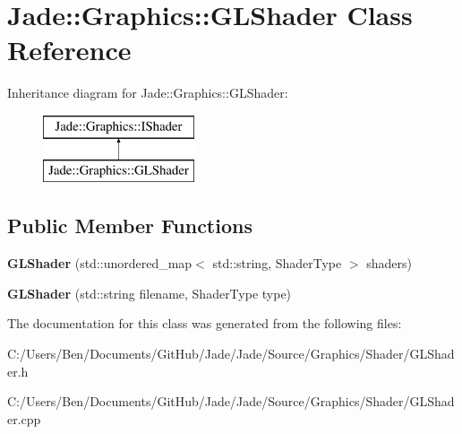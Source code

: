 \hypertarget{class_jade_1_1_graphics_1_1_g_l_shader}{}\section{Jade\+:\+:Graphics\+:\+:G\+L\+Shader Class Reference}
\label{class_jade_1_1_graphics_1_1_g_l_shader}
Inheritance diagram for Jade\+:\+:Graphics\+:\+:G\+L\+Shader\+:\begin{figure}[H]
\begin{center}
\leavevmode
\includegraphics[height=2.000000cm]{class_jade_1_1_graphics_1_1_g_l_shader}
\end{center}
\end{figure}
\subsection*{Public Member Functions}
\begin{DoxyCompactItemize}
\item 
\hypertarget{class_jade_1_1_graphics_1_1_g_l_shader_a346441d54fac35df84d48c6fbb36fb95}{}{\bfseries G\+L\+Shader} (std\+::unordered\+\_\+map$<$ std\+::string, Shader\+Type $>$ shaders)\label{class_jade_1_1_graphics_1_1_g_l_shader_a346441d54fac35df84d48c6fbb36fb95}

\item 
\hypertarget{class_jade_1_1_graphics_1_1_g_l_shader_a5428ee0d0ff44a8d18139ca7d9f86ce6}{}{\bfseries G\+L\+Shader} (std\+::string filename, Shader\+Type type)\label{class_jade_1_1_graphics_1_1_g_l_shader_a5428ee0d0ff44a8d18139ca7d9f86ce6}

\end{DoxyCompactItemize}


The documentation for this class was generated from the following files\+:\begin{DoxyCompactItemize}
\item 
C\+:/\+Users/\+Ben/\+Documents/\+Git\+Hub/\+Jade/\+Jade/\+Source/\+Graphics/\+Shader/G\+L\+Shader.\+h\item 
C\+:/\+Users/\+Ben/\+Documents/\+Git\+Hub/\+Jade/\+Jade/\+Source/\+Graphics/\+Shader/G\+L\+Shader.\+cpp\end{DoxyCompactItemize}
